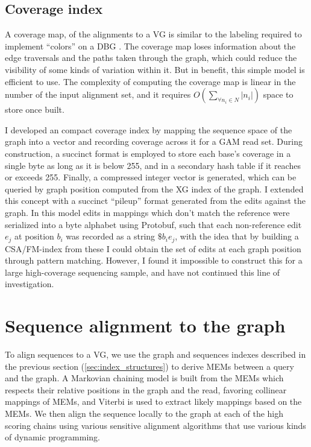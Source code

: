 \subsection{Coverage index}
\label{sec:coverage_index}

A coverage map, of the alignments to a VG is similar to the labeling required to implement ``colors'' on a DBG \cite{iqbal2012}.
The coverage map loses information about the edge traversals and the paths taken through the graph, which could reduce the visibility of some kinds of variation within it.
But in benefit, this simple model is efficient to use.
The complexity of computing the coverage map is linear in the number of the input alignment set, and it requires $O(\sum_{\forall{n_i\in N}}|n_i|)$ space to store once built.

I developed an compact coverage index by mapping the sequence space of the graph into a vector and recording coverage across it for a GAM read set.
During construction, a succinct format is employed to store each base's coverage in a single byte as long as it is below 255, and in a secondary hash table if it reaches or exceeds 255.
Finally, a compressed integer vector is generated, which can be queried by graph position computed from the XG index of the graph.
I extended this concept with a succinct ``pileup'' format \cite{li2009sequence} generated from the edits against the graph.
In this model edits in mappings which don't match the reference were serialized into a byte alphabet using Protobuf, such that each non-reference edit $e_j$ at position $b_i$ was recorded as a string $\$b_i e_j$, with the idea that by building a CSA/FM-index from these I could obtain the set of edits at each graph position through pattern matching.
However, I found it impossible to construct this for a large high-coverage sequencing sample, and have not continued this line of investigation.

\section{Sequence alignment to the graph}
To align sequences to a VG, we use the graph and sequences indexes described in the previous section (\ref{sec:index_structures}) to derive MEMs between a query and the graph.
A Markovian chaining model is built from the MEMs which respects their relative positions in the graph and the read, favoring collinear mappings of MEMs, and Viterbi is used to extract likely mappings based on the MEMs.
We then align the sequence locally to the graph at each of the high scoring chains using various sensitive alignment algorithms that use various kinds of dynamic programming.

